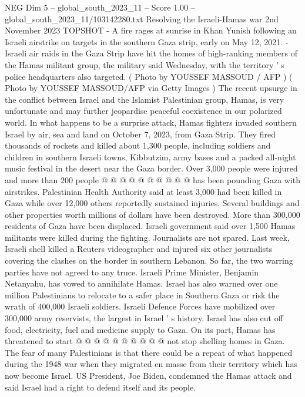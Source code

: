 \begin{textsample}{NEG Dim 5 – global\_south\_2023\_11 – Score 1.00 – global\_south\_2023\_11/103142280.txt}  \label{ex:f5_neg_180}
Resolving the Israeli-Hamas war 2nd November 2023 TOPSHOT - A fire rages at sunrise in Khan Yunish following an Israeli airstrike on targets in the southern Gaza strip, early on May 12, 2021. - Israeli air raids in the Gaza Strip have hit the homes of high-ranking members of the Hamas militant group, the military said Wednesday, with the territory ' s police headquarters also targeted. ( Photo by YOUSSEF MASSOUD / AFP ) ( Photo by YOUSSEF MASSOUD/AFP via Getty Images ) The recent upsurge in the conflict between Israel and the Islamist Palestinian group, Hamas, is very unfortunate and may further jeopardise peaceful coexistence in our polarized world.
In what happens to be a surprise attack, Hamas fighters invaded southern Israel by air, sea and land on October 7, 2023, from Gaza Strip.
They fired thousands of rockets and killed about 1,300 people, including soldiers and children in southern Israeli towns, Kibbutzim, army bases and a packed all-night music festival in the desert near the Gaza border.
Over 3,000 people were injured and more than 200 people @ @ @ @ @ @ @ @ @ @ has been pounding Gaza with airstrikes.
Palestinian Health Authority said at least 3,000 had been killed in Gaza while over 12,000 others reportedly sustained injuries.
Several buildings and other properties worth millions of dollars have been destroyed.
More than 300,000 residents of Gaza have been displaced.
Israeli government said over 1,500 Hamas militants were killed during the fighting.
Journalists are not spared.
Last week, Israeli shell killed a Reuters videographer and injured six other journalists covering the clashes on the border in southern Lebanon.
So far, the two warring parties have not agreed to any truce.
Israeli Prime Minister, Benjamin Netanyahu, has vowed to annihilate Hamas.
Israel has also warned over one million Palestinians to relocate to a safer place in Southern Gaza or risk the wrath of 400,000 Israeli soldiers.
Israeli Defence Forces have mobilized over 300,000 army reservists, the largest in Israel ' s history.
Israel has also cut off food, electricity, fuel and medicine supply to Gaza.
On its part, Hamas has threatened to start @ @ @ @ @ @ @ @ @ @ not stop shelling homes in Gaza.
The fear of many Palestinians is that there could be a repeat of what happened during the 1948 war when they migrated en masse from their territory which has now become Israel.
US President, Joe Biden, condemned the Hamas attack and said Israel had a right to defend itself and its people.

\end{textsample}
